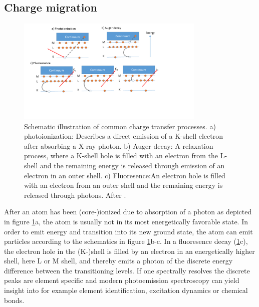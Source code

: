 \subsection{Charge migration}\label{sec:relaxation}
\begin{figure}
	\centering
		\includegraphics[width=0.80\textwidth]{images/el-relaxation.png}
	\caption[Schematic illustration of common charge transfer processes]{Schematic illustration of common charge transfer processes. a) photoionization: Describes a direct emission of a K-shell electron after absorbing a X-ray photon. b) Auger decay: A relaxation process, where a K-shell hole is filled with an electron from the L-shell and the remaining energy is released through emission of an electron in an outer shell. c) Fluoresence:An electron hole is filled with an electron from an outer shell and the remaining energy is released through photons. After \citep[][p.~19]{Als-Nielson-2011-JWS}.}
	\label{fig:el-relaxation}
\end{figure}
After an atom has been (core-)ionized due to absorption of a photon as depicted in figure \ref{fig:el-relaxation}a, the atom is usually not in its most energetically favorable state. In order to emit energy and transition into its new ground state, the atom can emit particles according to the schematics in figure \ref{fig:el-relaxation}b-c. In a fluoresence decay (\ref{fig:el-relaxation}c), the electron hole in the (K-)shell is filled by an electron in an energetically higher shell, here L or M shell, and thereby emits a photon of the discrete energy difference between the transitioning levels. If one spectrally resolves the discrete peaks are element specific and modern photoemission spectroscopy can yield insight into for example element identification, excitation dynamics or chemical bonds.
